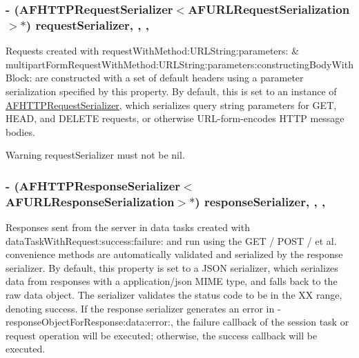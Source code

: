 \subsubsection[{request\+Serializer}]{\setlength{\rightskip}{0pt plus 5cm}-\/ ({\bf A\+F\+H\+T\+T\+P\+Request\+Serializer}$<${\bf A\+F\+U\+R\+L\+Request\+Serialization}$>$$\ast$) request\+Serializer\hspace{0.3cm}{\ttfamily [read]}, {\ttfamily [write]}, {\ttfamily [nonatomic]}, {\ttfamily [strong]}}\label{interface_a_f_h_t_t_p_request_operation_manager_ad5b4501e37b6b27dd94b17cd16d87287}
Requests created with {\ttfamily request\+With\+Method\+:\+U\+R\+L\+String\+:parameters\+:} \& {\ttfamily multipart\+Form\+Request\+With\+Method\+:\+U\+R\+L\+String\+:parameters\+:constructing\+Body\+With\+Block\+:} are constructed with a set of default headers using a parameter serialization specified by this property. By default, this is set to an instance of {\ttfamily \hyperlink{interface_a_f_h_t_t_p_request_serializer}{A\+F\+H\+T\+T\+P\+Request\+Serializer}}, which serializes query string parameters for {\ttfamily G\+E\+T}, {\ttfamily H\+E\+A\+D}, and {\ttfamily D\+E\+L\+E\+T\+E} requests, or otherwise U\+R\+L-\/form-\/encodes H\+T\+T\+P message bodies.

\begin{DoxyWarning}{Warning}
{\ttfamily request\+Serializer} must not be {\ttfamily nil}. 
\end{DoxyWarning}
\hypertarget{interface_a_f_h_t_t_p_request_operation_manager_a17ee8b74e591f5b45414bf502208238f}{}
\subsubsection[{response\+Serializer}]{\setlength{\rightskip}{0pt plus 5cm}-\/ ({\bf A\+F\+H\+T\+T\+P\+Response\+Serializer}$<${\bf A\+F\+U\+R\+L\+Response\+Serialization}$>$$\ast$) response\+Serializer\hspace{0.3cm}{\ttfamily [read]}, {\ttfamily [write]}, {\ttfamily [nonatomic]}, {\ttfamily [strong]}}\label{interface_a_f_h_t_t_p_request_operation_manager_a17ee8b74e591f5b45414bf502208238f}
Responses sent from the server in data tasks created with {\ttfamily data\+Task\+With\+Request\+:success\+:failure\+:} and run using the {\ttfamily G\+E\+T} / {\ttfamily P\+O\+S\+T} / et al. convenience methods are automatically validated and serialized by the response serializer. By default, this property is set to a J\+S\+O\+N serializer, which serializes data from responses with a {\ttfamily application/json} M\+I\+M\+E type, and falls back to the raw data object. The serializer validates the status code to be in the {\+X\+X} range, denoting success. If the response serializer generates an error in {\ttfamily -\/response\+Object\+For\+Response\+:data\+:error\+:}, the {\ttfamily failure} callback of the session task or request operation will be executed; otherwise, the {\ttfamily success} callback will be executed.

